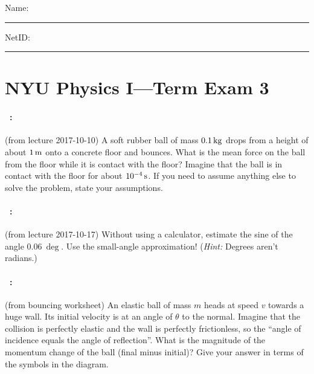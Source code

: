 \documentclass[12pt]{article} 
\begin{document}
\noindent
Name: \rule[-1ex]{0.55\textwidth}{0.1pt}
NetID: \rule[-1ex]{0.2\textwidth}{0.1pt}

\section*{NYU Physics I---Term Exam 3}

\paragraph{\problemname~\theproblem:}%
(from lecture 2017-10-10)
A soft rubber ball of mass $0.1\,\mathrm{kg}$ drops from a height of about
$1\,\mathrm{m}$ onto a concrete floor and bounces. What is the mean force on
the ball from the floor while it is contact with the floor? Imagine
that the ball is in contact with the floor for about $10^{-4}\,\mathrm{s}$. If
you need to assume anything else to solve the problem, state your
assumptions.

\vfill

\paragraph{\problemname~\theproblem:}%
(from lecture 2017-10-17)
Without using a calculator, estimate the sine of the angle $0.06~\deg$.
Use the small-angle approximation! (\emph{Hint:} Degrees aren't radians.)

\vfill

\paragraph{\problemname~\theproblem:}%
(from bouncing worksheet)
An elastic ball of mass $m$ heads at speed $v$ towards a huge wall.
Its initial velocity is at an angle of $\theta$ to the normal.
Imagine that the collision is perfectly elastic and the
wall is perfectly frictionless, so the ``angle of incidence equals the
angle of reflection''. What is the magnitude of the momentum change of the ball (final
minus initial)?
Give your answer in terms of the symbols in the diagram.
\end{document}
